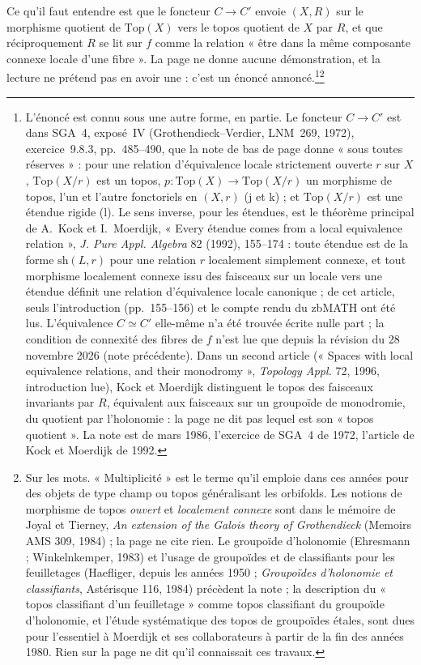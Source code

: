 \documentclass[11pt,a4paper]{article}
\begin{document}
Ce qu'il faut entendre est que le foncteur $C \to C'$ envoie $(X, R)$ sur le
morphisme quotient de $\mathrm{Top}(X)$ vers le topos quotient de $X$ par $R$,
et que réciproquement $R$ se lit sur $f$ comme la relation « être dans la
même composante connexe locale d'une fibre ». La page ne donne aucune
démonstration, et la lecture ne prétend pas en avoir une : c'est un énoncé
annoncé.\footnote{L'énoncé est connu sous une autre forme, en partie. Le
foncteur $C \to C'$ est dans SGA~4, exposé~IV (Grothendieck--Verdier, LNM~269,
1972), exercice~9.8.3, pp.~485--490, que la note de bas de page donne « sous
toutes réserves » : pour une relation d'équivalence locale strictement
ouverte $r$ sur $X$, $\mathrm{Top}(X/r)$ est un topos, $p \colon
\mathrm{Top}(X) \to \mathrm{Top}(X/r)$ un morphisme de topos, l'un et l'autre
fonctoriels en $(X, r)$ (j et k) ; et $\mathrm{Top}(X/r)$ est une étendue
rigide (l). Le sens inverse, pour les étendues, est le théorème principal de
A.~Kock et I.~Moerdijk, « Every étendue comes from a local equivalence
relation », \emph{J. Pure Appl. Algebra} 82 (1992), 155--174 : toute étendue
est de la forme $\mathrm{sh}(L, r)$ pour une relation $r$ localement
simplement connexe, et tout morphisme localement connexe issu des faisceaux
sur un locale vers une étendue définit une relation d'équivalence locale
canonique ; de cet article, seuls l'introduction (pp.~155--156) et le compte
rendu du zbMATH ont été lus. L'équivalence $C \simeq C'$ elle-même n'a été
trouvée écrite nulle part ; la condition de connexité des fibres de $f$
n'est lue que depuis la révision du 28 novembre 2026 (note précédente). Dans un second article (« Spaces with local
equivalence relations, and their monodromy », \emph{Topology Appl.} 72, 1996,
introduction lue), Kock et Moerdijk distinguent le topos des faisceaux
invariants par $R$, équivalent aux faisceaux sur un groupoïde de monodromie,
du quotient par l'holonomie : la page ne dit pas lequel est son « topos
quotient ». La note est de mars 1986, l'exercice de SGA~4 de 1972, l'article
de Kock et Moerdijk de 1992.}\footnote{Sur les mots. « Multiplicité » est le terme qu'il emploie
dans ces années pour des objets de type champ ou topos généralisant les
orbifolds. Les notions de morphisme de topos \emph{ouvert} et
\emph{localement connexe} sont dans le mémoire de Joyal et Tierney,
\emph{An extension of the Galois theory of Grothendieck} (Memoirs AMS 309,
1984) ; la page ne cite rien. Le groupoïde d'holonomie (Ehresmann ;
Winkelnkemper, 1983) et l'usage de groupoïdes et de classifiants pour les
feuilletages (Haefliger, depuis les années 1950 ; \emph{Groupoïdes d'holonomie
et classifiants}, Astérisque 116, 1984) précèdent la note ; la description du
« topos classifiant d'un feuilletage » comme topos classifiant du groupoïde
d'holonomie, et l'étude systématique des topos de groupoïdes étales, sont
dues pour l'essentiel à Moerdijk et ses collaborateurs à partir de la fin
des années 1980. Rien sur la page ne dit qu'il connaissait ces travaux.}
\end{document}
